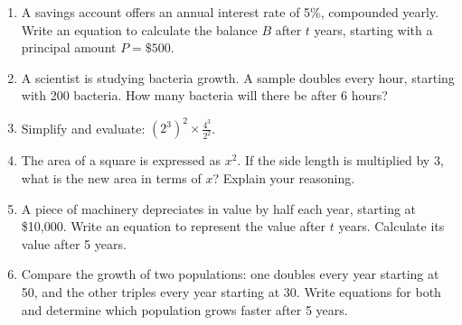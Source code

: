 \documentclass[12pt]{article}
\begin{document}
\begin{tcolorbox}[colframe=black!60, colback=white, 
coltitle=black, colbacktitle=black!15, fonttitle=\bfseries\Large, 
title=Problems, halign title=center, left=10pt, right=10pt, top=10pt, bottom=80pt]
\begin{enumerate}[start=10, itemsep=4em]
    \item A savings account offers an annual interest rate of 5\%, compounded yearly. Write an equation to calculate the balance \(B\) after \(t\) years, starting with a principal amount \(P = \$500\).
    \item A scientist is studying bacteria growth. A sample doubles every hour, starting with 200 bacteria. How many bacteria will there be after 6 hours?
    \item Simplify and evaluate: \( (2^3)^2 \times \frac{4^3}{2^2} \).
    \item The area of a square is expressed as \(x^2\). If the side length is multiplied by \(3\), what is the new area in terms of \(x\)? Explain your reasoning.
    \item A piece of machinery depreciates in value by half each year, starting at \$10,000. Write an equation to represent the value after \(t\) years. Calculate its value after 5 years.
    \item Compare the growth of two populations: one doubles every year starting at 50, and the other triples every year starting at 30. Write equations for both and determine which population grows faster after 5 years.
\end{enumerate}
\end{tcolorbox}
\end{document}
